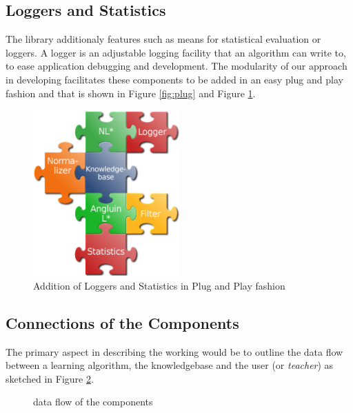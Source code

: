 \subsection{Loggers and Statistics}	
	The library additionaly features such as means for statistical evaluation or loggers. A logger is an adjustable logging facility that an algorithm can write to, to ease application debugging and development.	
	The modularity of our approach in developing \libalf facilitates these components to be added in an easy plug and play fashion and that is shown in Figure \ref{fig:plug} and Figure \ref{fig:loggers}.
	
\begin{figure}[h]
	\centering
	\includegraphics[width=0.5\textwidth]{Images/combined6.png}
	\caption{Addition of Loggers and Statistics in Plug and Play fashion}
	\label{fig:loggers}
\end{figure}
	
\subsection{Connections of the Components}

The primary aspect in describing the working would be to outline the data flow between a learning algorithm, the knowledgebase and the user (or \emph{teacher}) as sketched in Figure \ref{communications}.

\begin{figure}
\centering
{}
\caption{data flow of the \libalf components}
\label{communications}
\end{figure}

